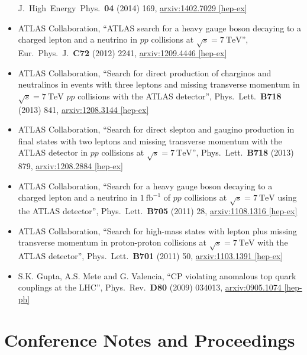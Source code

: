 \documentclass[a4paper,10pt]{article}
\begin{document}
\begin{itemize}
	J.\ High\ Energy\ Phys.\ {\bf 04} (2014) 169,
	\href{http://arxiv.org/abs/1402.7029}{arxiv:1402.7029 [hep-ex]}
	\item ATLAS Collaboration,
	``ATLAS search for a heavy gauge boson decaying to a charged lepton and a neutrino in $pp$ collisions at $\sqrt{s} = 7\ \mathrm{TeV}$'',
	Eur.\ Phys.\ J.\ {\bf C72} (2012) 2241,
	\href{http://arxiv.org/abs/1209.4446}{arxiv:1209.4446 [hep-ex]}
	\item ATLAS Collaboration,
	``Search for direct production of charginos and neutralinos in events with three leptons and missing transverse momentum in $\sqrt{s} = 7\ \mathrm{TeV}$ $pp$ collisions with the ATLAS detector'', 
	Phys.\ Lett.\ {\bf B718} (2013) 841, 
	\href{http://arxiv.org/abs/1208.3144}{arxiv:1208.3144 [hep-ex]}
	\item ATLAS Collaboration,
	``Search for direct slepton and gaugino production in final states with two leptons and missing transverse momentum with the ATLAS detector in $pp$ collisions at $\sqrt{s} = 7\ \mathrm{TeV}$'', 
	Phys.\ Lett.\ {\bf B718} (2013) 879, \href{http://arxiv.org/abs/1208.2884}{arxiv:1208.2884 [hep-ex]}
	\item ATLAS Collaboration,
	``Search for a heavy gauge boson decaying to a charged lepton and a neutrino in $1\ \mathrm{fb}^{-1}$ of $pp$ collisions at $\sqrt{s} = 7\ \mathrm{TeV}$ using the ATLAS detector'', 
	Phys.\ Lett.\ {\bf B705} (2011) 28, 
	\href{http://arxiv.org/abs/arXiv:1108.1316}{arxiv:1108.1316 [hep-ex]}
	\item ATLAS Collaboration,
	``Search for high-mass states with lepton plus missing transverse momentum in proton-proton collisions at $\sqrt{s} = 7\ \mathrm{TeV}$ with the ATLAS detector'', 
	Phys.\ Lett.\ {\bf B701} (2011) 50, 
	\href{http://arxiv.org/abs/1103.1391}{arxiv:1103.1391 [hep-ex]}
	\item S.K. Gupta, A.S. Mete and G. Valencia,
	``CP violating anomalous top quark couplings at the LHC'',  
	Phys.\ Rev.\ {\bf D80} (2009) 034013, 
	\href{http://arxiv.org/abs/0905.1074}{arxiv:0905.1074 [hep-ph]}
\end{itemize}

\newpage

\vspace{3mm}
\section{Conference Notes and Proceedings}
\end{document}
